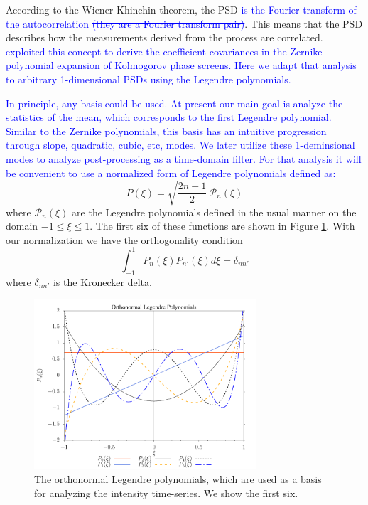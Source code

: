 \documentclass[10pt,preprint]{aastex631}
\newcommand{\jrmadd}[1]{\textcolor{blue}{#1}}
\newcommand{\jrmrmv}[1]{\textcolor{blue}{\sout{#1}}}
\begin{document}
According to the Wiener-Khinchin theorem, the PSD \jrmadd{is the Fourier transform of the autocorrelation} \jrmrmv{(they are a Fourier transform pair)}.  This means that the PSD describes how the measurements derived from the process are correlated. \jrmadd{\citet{1976JOSA...66..207N} exploited this concept to derive the coefficient covariances in the Zernike polynomial expansion of Kolmogorov phase screens.  Here we adapt that analysis to arbitrary 1-dimensional PSDs using the Legendre polynomials.}  

\jrmadd{In principle, any basis could be used.  At present our main goal is analyze the statistics of the mean, which corresponds to the first Legendre polynomial.  Similar to the Zernike polynomials, this basis has an intuitive progression through slope, quadratic, cubic, etc, modes. We later utilize these 1-deminsional modes to analyze post-processing as a time-domain filter.  For that analysis it will be convenient to use a normalized form of Legendre polynomials defined as:}
\begin{equation}
P(\xi) = \sqrt{\frac{2n+1}{2}}\, \mathscr{P}_n(\xi)
\label{eqn:basis}
\end{equation}
where $\mathscr{P}_n(\xi)$ are the Legendre polynomials defined in the usual manner \citep[cf.][]{Olver:2010:NHMF} on the domain $-1 \le \xi \le 1$. The first six of these functions are shown in Figure \ref{fig:onlegpol}.  With our normalization we have the orthogonality condition
\begin{equation}
\int_{-1}^{1}P_n(\xi)P_{n'}(\xi) d\xi = \delta_{nn'}
\label{eqn:orthonormal}
\end{equation}
where $\delta_{nn'}$ is the Kronecker delta. 

\begin{figure}[h]
\centering
\includegraphics[width=3.25in]{onLegPol.pdf}
\caption{The orthonormal Legendre polynomials, which are used as a basis for analyzing the intensity time-series.  We show the first six. \label{fig:onlegpol}}
\end{figure}
\end{document}
